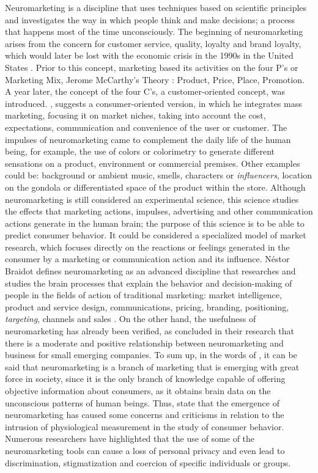 \documentclass[english]{textolivre}
\begin{document}
Neuromarketing is a discipline that uses techniques based on scientific principles and investigates the way in which people think and make decisions; a process that happens most of the time unconsciously. The beginning of neuromarketing arises from the concern for customer service, quality, loyalty and brand loyalty, which would later be lost with the economic crisis in the 1990s in the United States \cite{jones_historical_1990}. Prior to this concept, marketing based its activities on the four P's or Marketing Mix, Jerome McCarthy's Theory \cite{mccarthy_basic_1964}: Product, Price, Place, Promotion. A year later, the concept of the four C's, a customer-oriented concept, was introduced. \textcite{lauterborn_new_1990}, suggests a consumer-oriented version, in which he integrates mass marketing, focusing it on market niches, taking into account the cost, expectations, communication and convenience of the user or customer. The impulses of neuromarketing came to complement the daily life of the human being, for example, the use of colors or colorimetry to generate different sensations on a product, environment or commercial premises. Other examples could be: background or ambient music, smells, characters or \textit{influencers}, location on the gondola or differentiated space of the product within the store. Although neuromarketing is still considered an experimental science, this science studies the effects that marketing actions, impulses, advertising and other communication actions generate in the human brain; the purpose of this science is to be able to predict consumer behavior. It could be considered a specialized model of market research, which focuses directly on the reactions or feelings generated in the consumer by a marketing or communication action and its influence. Néstor Braidot defines neuromarketing as an advanced discipline that researches and studies the brain processes that explain the behavior and decision-making of people in the fields of action of traditional marketing: market intelligence, product and service design, communications, pricing, branding, positioning, \textit{targeting}, channels and sales \cite{braidot_neuromarketing_2009}. On the other hand, the usefulness of neuromarketing has already been verified, as \textcite{barco_neuromarketing_2021} concluded in their research that there is a moderate and positive relationship between neuromarketing and business for small emerging companies. To sum up, in the words of \textcite{caicedo_bibliometric_2021}, it can be said that neuromarketing is a branch of marketing that is emerging with great force in society, since it is the only branch of knowledge capable of offering objective information about consumers, as it obtains brain data on the unconscious patterns of human beings. Thus, \textcite{lyu_problemas_2021} state that the emergence of neuromarketing has caused some concerns and criticisms in relation to the intrusion of physiological measurement in the study of consumer behavior.  Numerous researchers have highlighted that the use of some of the neuromarketing tools can cause a loss of personal privacy and even lead to discrimination, stigmatization and coercion of specific individuals or groups.
\end{document}
